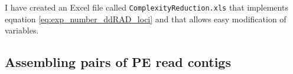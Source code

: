 \documentclass[a4paper,12pt,times,print,index,custombib,custommargin]{PhDThesisPSnPDF}\usepackage[]{graphicx}\usepackage[]{color}
\begin{document}
I have created an Excel file called \texttt{ComplexityReduction.xls} that implements equation \ref{eq:exp_number_ddRAD_loci} and that allows easy modification of variables.


\FloatBarrier
\subsection{Assembling pairs of PE read contigs}
\label{ch:read_mapping}
\end{document}
